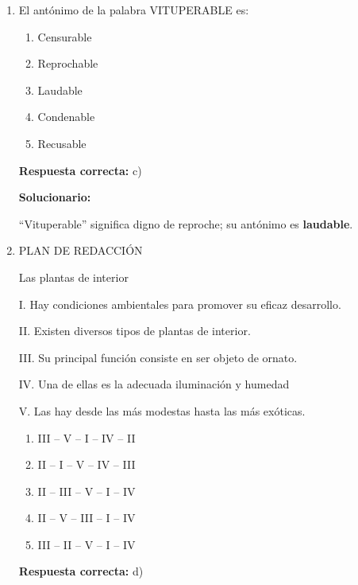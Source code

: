 \begin{enumerate}[resume]
	¿Cuál es la relación entre las palabras subrayadas?
	\begin{enumerate}[label=\alph*)]
		\item Paronimia
		\item Homografía
		\item Homofonía
		\item Polisemia
		\item Homonimia
	\end{enumerate}
	\textbf{Respuesta correcta:} d)
	
	\vspace{2mm}
	\textbf{Solucionario:}
	
	La palabra ``estación'' tiene varios significados relacionados entre sí; eso es \textbf{polisemia}.
	
	\vspace{6mm}
	
	\item El antónimo de la palabra VITUPERABLE es:
	\begin{enumerate}[label=\alph*)]
		\item Censurable
		\item Reprochable
		\item Laudable
		\item Condenable
		\item Recusable
	\end{enumerate}
	\textbf{Respuesta correcta:} c)
	
	\vspace{2mm}
	\textbf{Solucionario:}
	
	``Vituperable'' significa digno de reproche; su antónimo es \textbf{laudable}.
	
	\vspace{6mm}
	
	\item PLAN DE REDACCIÓN
	
	Las plantas de interior
	
	I. Hay condiciones ambientales para promover su eficaz desarrollo.
	
	II. Existen diversos tipos de plantas de interior.
	
	III. Su principal función consiste en ser objeto de ornato.
	
	IV. Una de ellas es la adecuada iluminación y humedad
	
	V. Las hay desde las más modestas hasta las más exóticas.
	
	\begin{enumerate}[label=\alph*)]
		\item III -- V -- I -- IV -- II
		\item II -- I -- V -- IV -- III
		\item II -- III -- V -- I -- IV
		\item II -- V -- III -- I -- IV
		\item III -- II -- V -- I -- IV
	\end{enumerate}
	\textbf{Respuesta correcta:} d)
	

\end{enumerate}
